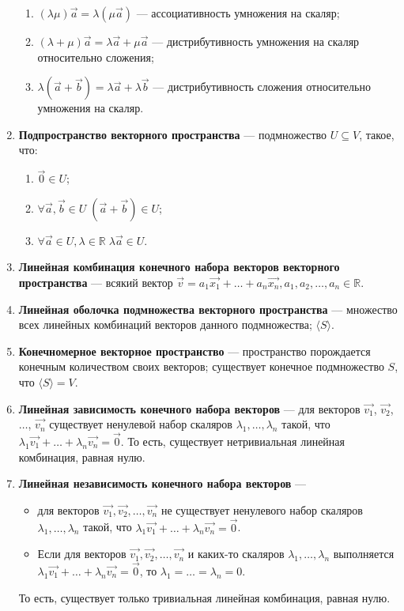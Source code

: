 \documentclass[a4paper, 12pt]{article}
\begin{document}
\begin{enumerate}
\begin{enumerate}
\item $(\lambda \mu)\vec{a} = \lambda(\mu \vec{a})$ --- ассоциативность умножения на скаляр;

\item $(\lambda + \mu)\vec{a} = \lambda \vec{a} + \mu \vec{a}$ --- дистрибутивность умножения на скаляр относительно сложения;

\item $\lambda(\vec{a} + \vec{b}) = \lambda \vec{a} + \lambda \vec{b}$ --- дистрибутивность сложения относительно умножения на скаляр.
\end{enumerate}

\item \textbf{Подпространство векторного пространства} — подмножество $U \subseteq V$, такое, что:
\begin{enumerate}
\item $\vec0 \in U$;
\item $\forall \vec{a}, \vec{b} \in U\; (\vec{a}+\vec{b}) \in U$;
\item $\forall \vec{a} \in U, \lambda \in \mathbb{R}\; \lambda \vec{a} \in U$.
\end{enumerate}

\item \textbf{Линейная комбинация конечного набора векторов векторного пространства} --- всякий вектор $\vec v =  a_1\vec{x_1} + \ldots + a_n\vec{x_n}, a_1, a_2, \ldots, a_n \in \mathbb{R}$. 

\item \textbf{Линейная оболочка подмножества векторного пространства} — множество всех линейных комбинаций векторов данного подмножества; $\langle S \rangle$.

\item \textbf{Конечномерное векторное пространство} — пространство порождается конечным количеством своих векторов; существует конечное подмножество $S$, что $\langle S \rangle=V$.

\item \textbf{Линейная зависимость конечного набора векторов} — для векторов $\vec{v_1}$, $\vec{v_2}$, $\ldots$, $\vec{v_n}$ существует ненулевой набор скаляров $\lambda_1, \ldots, \lambda_n$ такой, что $\lambda_1\vec{v_1} + \ldots + \lambda_n\vec{v_n} = \vec{0}$. То есть, существует нетривиальная линейная комбинация, равная нулю.

\item \textbf{Линейная независимость конечного набора векторов} — \begin{itemize}
\item для векторов $\vec{v_1}, \vec{v_2}, \ldots, \vec{v_n}$ не существует ненулевого набор скаляров $\lambda_1, \ldots, \lambda_n$ такой, что $\lambda_1\vec{v_1} + \ldots + \lambda_n\vec{v_n} = \vec{0}$.
\item Если для векторов $\vec{v_1}, \vec{v_2}, \ldots, \vec{v_n}$ и каких-то скаляров $\lambda_1, \ldots, \lambda_n$ выполняется $\lambda_1\vec{v_1} + \ldots + \lambda_n\vec{v_n} = \vec{0}$, то $\lambda_1 = \ldots = \lambda_n = 0$.
\end{itemize} То есть, существует только тривиальная линейная комбинация, равная нулю.


\end{enumerate}
\end{document}
